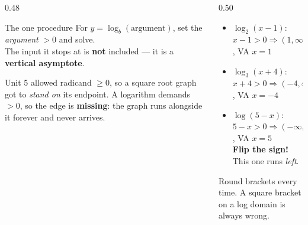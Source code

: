 \documentclass[aspectratio=169, 11pt]{beamer}
\begin{document}
\begin{frame}[t, plain]
  \begin{columns}[T]
    \begin{column}{0.48\textwidth}
      \begin{block}{The one procedure}
        For $y=\log_b(\text{argument})$, set the \emph{argument} $>0$ and solve. \\[3pt]
        The input it stops at is \textbf{not} included --- it is a \textbf{vertical asymptote}.
      \end{block}
      \vspace{4pt}
      {\footnotesize Unit 5 allowed radicand $\ge 0$, so a square root graph got to \emph{stand on}
      its endpoint. A logarithm demands $>0$, so the edge is \textbf{missing}: the graph runs
      alongside it forever and never arrives.}
    \end{column}
    \begin{column}{0.50\textwidth}
      \begin{itemize}\setlength{\itemsep}{5pt}
        \item $\log_2(x-1)$: \; $x-1>0 \Rightarrow (1,\infty)$, \; VA $x=1$
        \item $\log_3(x+4)$: \; $x+4>0 \Rightarrow (-4,\infty)$, \; VA $x=-4$
        \item $\log(5-x)$: \; $5-x>0 \Rightarrow (-\infty,5)$, \; VA $x=5$ \\
              {\footnotesize \textbf{Flip the sign!} This one runs \emph{left}.}
      \end{itemize}
      \vspace{4pt}
      {\footnotesize Round brackets every time. A square bracket on a log domain is always wrong.}
    \end{column}
  \end{columns}
\end{frame}
\end{document}
